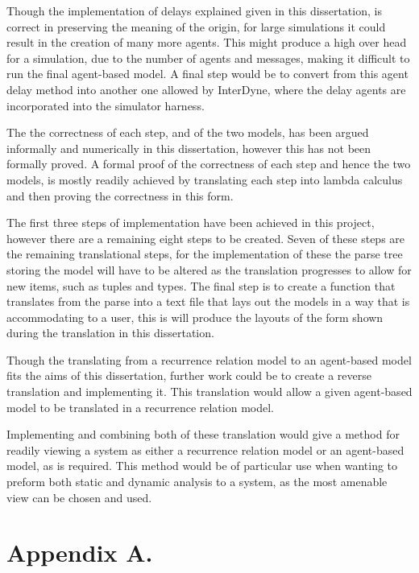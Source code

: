 \documentclass{article}
\begin{document}
Though the implementation of delays explained given in this dissertation, is correct in preserving the meaning of the origin, for large simulations it could result in the creation of many more agents. This might produce a high over head for a simulation, due to the number of agents and messages, making it difficult to run the final agent-based model. A final step would be to convert from this agent delay method into another one allowed by InterDyne, where the delay agents are incorporated into the simulator harness.  

The the correctness of each step, and of the two models, has been argued informally and numerically in this dissertation, however this has not been formally proved. A formal proof of the correctness of each step and hence the two models, is mostly readily achieved by translating each step into lambda calculus and then proving the correctness in this form. 

The first three steps of implementation have been achieved in this project, however there are a remaining eight steps to be created. Seven of these steps are the remaining translational steps, for the implementation of these the parse tree storing the model will have to be altered as the translation progresses to allow for new items, such as tuples and types. The final step is to create a function that translates from the parse into a text file that lays out the models in a way that is accommodating to a user, this is will produce the layouts of the form shown during the translation in this dissertation.    

Though the translating from a recurrence relation model to an agent-based model fits the aims of this dissertation, further work could be to create a reverse translation and implementing it. This translation would allow a given agent-based model to be translated in a recurrence relation model. 

Implementing and combining both of these translation would give a method for readily viewing a system as either a recurrence relation model or an agent-based model, as is required. This method would be of particular use when wanting to preform both static and dynamic analysis to a system, as the most amenable view can be chosen and used. 










\newpage 
\section{Appendix A.}
%
\end{document}
